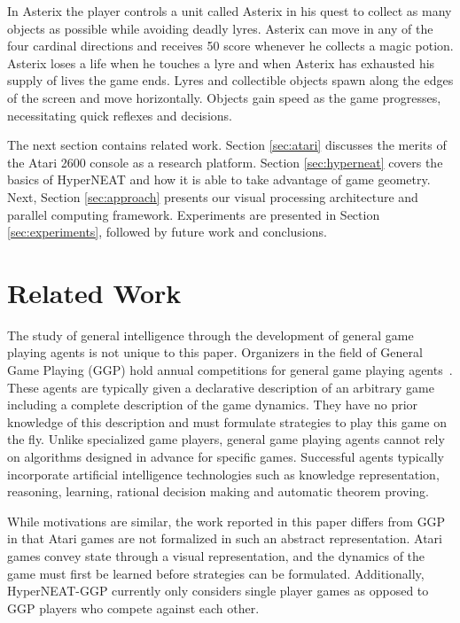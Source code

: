 \documentclass{sig-alternate}
\begin{document}
In Asterix the player controls a unit called Asterix in his quest to collect as many objects as possible while avoiding deadly lyres. Asterix can move in any of the four cardinal directions and receives 50 score whenever he collects a magic potion. Asterix loses a life when he touches a lyre and when Asterix has exhausted his supply of lives the game ends. Lyres and collectible objects spawn along the edges of the screen and move horizontally. Objects gain speed as the game progresses, necessitating quick reflexes and decisions.

The next section contains related work. Section \ref{sec:atari} discusses the merits of the Atari 2600 console as a research platform. Section \ref{sec:hyperneat} covers the basics of HyperNEAT and how it is able to take advantage of game geometry. Next, Section \ref{sec:approach} presents our visual processing architecture and parallel computing framework. Experiments are presented in Section \ref{sec:experiments}, followed by future work and conclusions.


\section{Related Work}
\label{sec:background}
The study of general intelligence through the development of general game playing agents is not unique to this paper. Organizers in the field of General Game Playing (GGP) hold annual competitions for general game playing agents~\cite{genesereth05}. These agents are typically given a declarative description of an arbitrary game including a complete description of the game dynamics. They have no prior knowledge of this description and must formulate strategies to play this game on the fly. Unlike specialized game players, general game playing agents cannot rely on algorithms designed in advance for specific games. Successful agents typically incorporate artificial intelligence technologies such as knowledge representation, reasoning, learning, rational decision making and automatic theorem proving. 

While motivations are similar, the work reported in this paper differs from GGP in that Atari games are not formalized in such an abstract representation. Atari games convey state through a visual representation, and the dynamics of the game must first be learned before strategies can be formulated. Additionally, HyperNEAT-GGP currently only considers single player games as opposed to GGP players who compete against each other.
\end{document}
